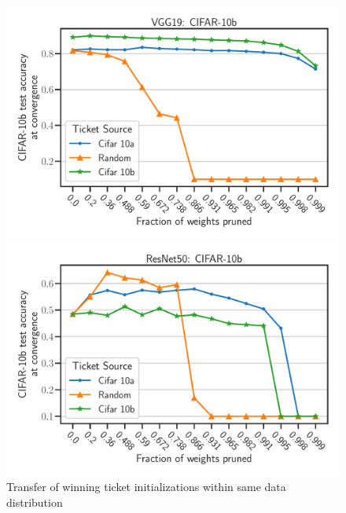 \documentclass{article}
\begin{document}
  
\begin{figure}[h]
    \centering
    \begin{minipage}{.497\textwidth}
    \centering
    \includegraphics[width=\textwidth]{plots/Exp1_VGG_N.pdf}
    \end{minipage}
    \begin{minipage}{.497\textwidth}
    \centering
    \includegraphics[width=\textwidth]{plots/Exp1_ResNet_N.pdf}
    \end{minipage}
    \caption{Transfer of winning ticket initializations within same data distribution}
    \label{fig:exp1}
\end{figure}
\end{document}
